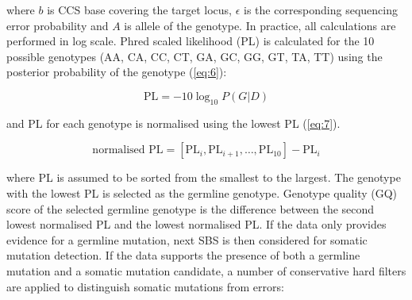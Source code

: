 where $b$ is CCS base covering the target locus, $\epsilon$ is the corresponding sequencing error probability and $A$ is allele of the genotype. In practice, all calculations are performed in log scale. Phred scaled likelihood (PL) is calculated for the 10 possible genotypes (AA, CA, CC, CT, GA, GC, GG, GT, TA, TT) using the posterior probability of the genotype (\ref{eq:6}):

\begin{equation} \label{eq:6}
\text{PL} = -10\log_{10}P(G|D) 
\end{equation}

and PL for each genotype is normalised using the lowest PL (\ref{eq:7}).

\begin{equation} \label{eq:7}
\text{normalised PL} = [\text{PL}_{i}, \text{PL}_{i+1}, \ldots, \text{PL}_{10}] - \text{PL}_{i}
\end{equation}

where PL is assumed to be sorted from the smallest to the largest. The genotype with the lowest PL is selected as the germline genotype. Genotype quality (GQ) score of the selected germline genotype is the difference between the second lowest normalised PL and the lowest normalised PL. If the data only provides evidence for a germline mutation, next SBS is then considered for somatic mutation detection. If the data supports the presence of both a germline mutation and a somatic mutation candidate, a number of conservative hard filters are applied to distinguish somatic mutations from errors:

